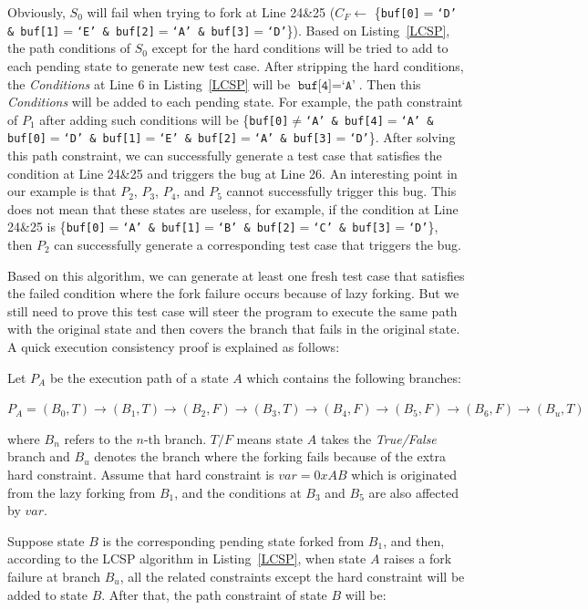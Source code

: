 Obviously, $S_0$ will fail when trying to fork at Line 24\&25 ($C_{F}\leftarrow$ \{\texttt{buf[0]$=$`D' \& buf[1]$=$`E' \& buf[2]$=$`A' \& buf[3]$=$`D'}\}). Based on Listing~\ref{LCSP}, the path conditions of $S_0$ except for the hard conditions will be tried to add to each pending state to generate new test case. 
After stripping the hard conditions, the \textit{Conditions} at Line 6 in Listing~\ref{LCSP} will be $\texttt{buf[4]}=\texttt{`A'}$. Then this \textit{Conditions} will be added to each pending state. For example, the path constraint of $P_1$ after adding such conditions will be \{\texttt{buf[0]$\neq$`A' \& buf[4]$=$`A' \& buf[0]$=$`D' \& buf[1]$=$`E' \& buf[2]$=$`A' \& buf[3]$=$`D'}\}. After solving this path constraint, we can successfully generate a test case that satisfies the condition at Line 24\&25 and triggers the bug at Line 26. 
An interesting point in our example is that $P_2$, $P_3$, $P_4$, and $P_5$ cannot successfully trigger this bug. This does not mean that these states are useless, for example, if the condition at Line 24\&25 is \{\texttt{buf[0]$=$`A' \& buf[1]$=$`B' \& buf[2]$=$`C' \& buf[3]$=$`D'}\}, then $P_2$ can successfully generate a corresponding test case that triggers the bug.

Based on this algorithm, we can generate at least one fresh test case that satisfies the failed condition where the fork failure occurs because of lazy forking. But we still need to prove this test case will steer the program to execute the same path with the original state and then covers the branch that fails in the original state. A quick execution consistency proof is explained as follows:

Let $P_A$ be the execution path of a state $A$ which contains the following branches:


\begin{center}
$P_A = (B_0,T) \rightarrow (B_1,T) \rightarrow (B_2,F) \rightarrow (B_3,T)
\rightarrow (B_4,F) \rightarrow (B_5,F) \rightarrow (B_6,F) \rightarrow (B_u,T)$
\end{center}

\noindent where $B_n$ refers to the $n$-th branch. $T/F$ means state $A$ takes the \emph{True/False} branch and $B_u$ denotes the branch where the forking fails because of the extra hard constraint. Assume that hard constraint is $var=0xAB$ which is originated from the lazy forking from $B_1$, and the conditions at $B_3$ and $B_5$ are also affected by $var$.

Suppose state $B$ is the corresponding pending state forked from $B_1$, and then, according to the LCSP algorithm in Listing~\ref{LCSP}, when state $A$ raises a fork failure at branch $B_u$, all the related constraints except the hard constraint will be added to state $B$. After that, the path constraint of state $B$ will be:

